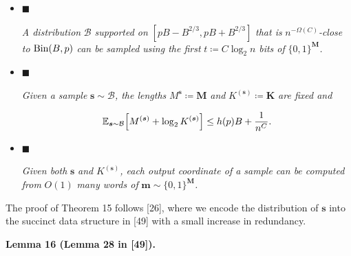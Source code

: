 \begin{itemize}


\item[] 
$\blacksquare$ 


\emph{A distribution }$\mathcal{B}$\emph{ supported on }$[pB-B^{2/3},pB+B^{2/3}]$\emph{ that is }$n^{-\Omega(C)}$\emph{-close to }$\textnormal{Bin}(B,p)$\emph{ can be sampled using the first }$t\coloneq C\log_{2}n$\emph{ bits of }$\{0,1\}^{\boldsymbol{M}}$\emph{.}\par





\item[] 
$\blacksquare$ 


\emph{Given a sample }$\boldsymbol{s}\sim\mathcal{B}$\emph{, the lengths }$M^{\boldsymbol{s}}\coloneq\boldsymbol{M}$\emph{ and }$K^{(\boldsymbol{s})}\coloneq\boldsymbol{K}$\emph{ are fixed and}\par


\[\begin{gathered}
\operatorname{\mathbb{E}}_{\boldsymbol{s}\sim\mathcal{B}}\Bigl[M^{(\boldsymbol{s})}+\log_{2}K^{(\boldsymbol{s})}\Bigr]\leq h(p)B+\frac{1}{n^{C}}.
\end{gathered}\]





\item[] 
$\blacksquare$ 


\emph{Given both }$\boldsymbol{s}$\emph{ and }$K^{(\boldsymbol{s})}$\emph{, each output coordinate of a sample can be computed from }$O(1)$\emph{ many words of }$\boldsymbol{m}\sim\{0,1\}^{\boldsymbol{M}}$\emph{.}\par





\end{itemize}






The proof of Theorem 15 follows [26], where we encode the distribution of $\boldsymbol{s}$ into the succinct data structure in [49] with a small increase in redundancy.\par





\par\medskip\noindent\textbf{
\textbf{Lemma 16}\textbf{ }(Lemma 28 in [49])\textbf{.}
}\par



